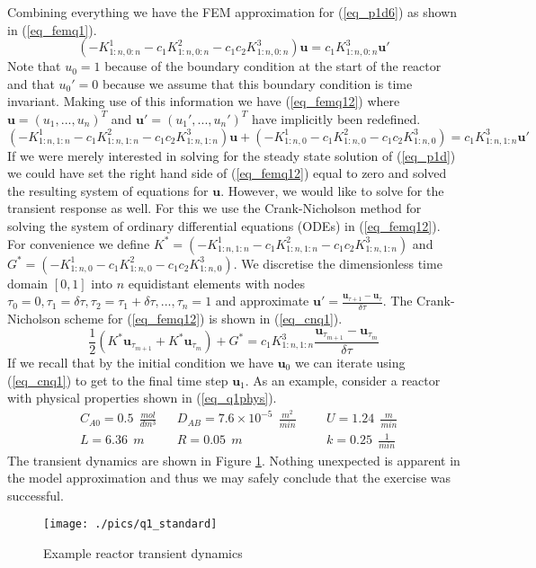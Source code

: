 \documentclass[11pt,fleqn]{article}
\theoremstyle{defstyle}
\begin{document}
Combining everything we have the FEM approximation for (\ref{eq_p1d6}) as shown in (\ref{eq_femq1}). 
\begin{equation}
\left(-K^1_{1:n,0:n}-c_1K^2_{1:n,0:n}-c_1c_2K^3_{1:n,0:n} \right)\mathbf{u} =  c_1K^3_{1:n,0:n}\mathbf{u}\prime
\label{eq_femq1}
\end{equation}
Note that $u_0=1$ because of the boundary condition at the start of the reactor and that $u_0\prime=0$ because we assume that this boundary condition is time invariant. Making use of this information we have (\ref{eq_femq12}) where $\mathbf{u}=\left(u_1,...,u_n\right)^T$ and $\mathbf{u}\prime=\left(u_1\prime,...,u_n\prime \right)^T$ have implicitly been redefined.
\begin{equation}
\left(-K^1_{1:n,1:n}-c_1K^2_{1:n,1:n}-c_1c_2K^3_{1:n,1:n} \right)\mathbf{u} +\left(-K^1_{1:n,0}-c_1K^2_{1:n,0} -c_1c_2K^3_{1:n,0}\right) =  c_1K^3_{1:n,1:n}\mathbf{u}\prime
\label{eq_femq12}
\end{equation}
If we were merely interested in solving for the steady state solution of (\ref{eq_p1d}) we could have set the right hand side of (\ref{eq_femq12}) equal to zero and solved the resulting system of equations for $\mathbf{u}$. However, we would like to solve for the transient response as well. For this we use the Crank-Nicholson method for solving the system of ordinary differential equations (ODEs) in (\ref{eq_femq12}). For convenience we define $K^* = \left(-K^1_{1:n,1:n}-c_1K^2_{1:n,1:n}-c_1c_2K^3_{1:n,1:n} \right)$ and $G^{*} = \left(-K^1_{1:n,0}-c_1K^2_{1:n,0} -c_1c_2K^3_{1:n,0}\right)$. We discretise the dimensionless time domain $[0,1]$ into $n$ equidistant elements with nodes $\tau_0 = 0, \tau_1=\delta \tau, \tau_2=\tau_1 + \delta \tau,...,\tau_n=1$ and approximate $\mathbf{u}\prime = \frac{\mathbf{u}_{\tau+1} -\mathbf{u}_{\tau}}{\delta \tau}$. The Crank-Nicholson scheme for (\ref{eq_femq12}) is shown in (\ref{eq_cnq1}).
\begin{equation}
\frac{1}{2}\left( K^*\mathbf{u}_{\tau_{m+1}} + K^*\mathbf{u}_{\tau_m} \right) + G^* = c_1K^3_{1:n,1:n}\frac{\mathbf{u}_{\tau_{m+1}} -\mathbf{u}_{\tau_{m}}}{\delta \tau}
\label{eq_cnq1}
\end{equation} 
If we recall that by the initial condition we have $\mathbf{u}_0$ we can iterate using (\ref{eq_cnq1}) to get to the final time step $\mathbf{u}_1$. As an example, consider a reactor with physical properties shown in (\ref{eq_q1phys}).
\begin{equation}
\begin{aligned}
&C_{A0} = 0.5~~ \frac{mol}{dm^3}
&&D_{AB} = 7.6\times 10^{-5} ~~\frac{m^2}{min}
&&&U = 1.24~~ \frac{m}{min} \\
&L = 6.36~~ m 
&&R = 0.05~~ m
&&&k = 0.25~~ \frac{1}{min} 
\end{aligned}
\label{eq_q1phys}
\end{equation}
The transient dynamics are shown in Figure \ref{fig_q1std}. Nothing unexpected is apparent in the model approximation and thus we may safely conclude that the exercise was successful.
\begin{figure}[H] 
\centering
\texttt{[image: ./pics/q1\_standard]}
\caption{Example reactor transient dynamics} 
\label{fig_q1std}
\end{figure}
\end{document}
